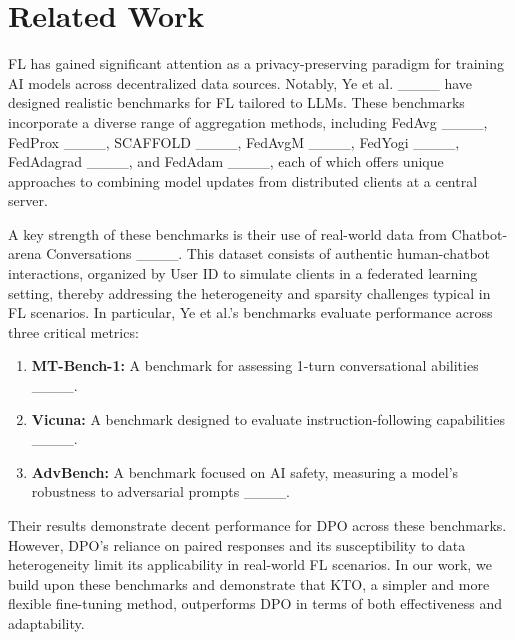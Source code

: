 \section{Related Work}
\label{sec:related}

FL has gained significant attention as a privacy-preserving paradigm for training AI models across decentralized data sources. Notably, Ye et al. ____ have designed realistic benchmarks for FL tailored to LLMs. These benchmarks incorporate a diverse range of aggregation methods, including FedAvg ____, FedProx ____, SCAFFOLD ____, FedAvgM ____, FedYogi ____, FedAdagrad ____, and FedAdam ____, each of which offers unique approaches to combining model updates from distributed clients at a central server.

A key strength of these benchmarks is their use of real-world data from Chatbot-arena Conversations ____. This dataset consists of authentic human-chatbot interactions, organized by User ID to simulate clients in a federated learning setting, thereby addressing the heterogeneity and sparsity challenges typical in FL scenarios. 
In particular, Ye et al.'s benchmarks evaluate performance across three critical metrics: 
\begin{enumerate}
    \item \textbf{MT-Bench-1:} A benchmark for assessing 1-turn conversational abilities ____.
    \item \textbf{Vicuna:} A benchmark designed to evaluate instruction-following capabilities ____.
    \item \textbf{AdvBench:} A benchmark focused on AI safety, measuring a model’s robustness to adversarial prompts ____.
\end{enumerate}

Their results demonstrate decent performance for DPO across these benchmarks. However, DPO's reliance on paired responses and its susceptibility to data heterogeneity limit its applicability in real-world FL scenarios. In our work, we build upon these benchmarks and demonstrate that KTO, a simpler and more flexible fine-tuning method, outperforms DPO in terms of both effectiveness and adaptability. 

%
